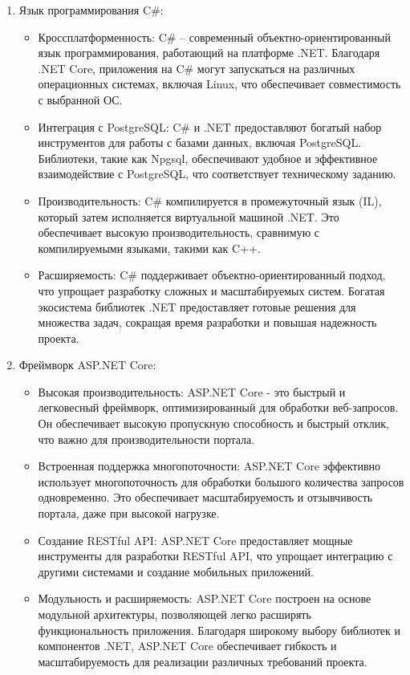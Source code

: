 \begin{enumerate}
	\item Язык программирования C\#:
	\begin{itemize}
		\item Кроссплатформенность: C\# -- современный объектно-ориентированный язык программирования, работающий на платформе .NET. Благодаря .NET Core, приложения на C\# могут запускаться на различных операционных системах, включая Linux, что обеспечивает совместимость с выбранной ОС.
		
		\item Интеграция с PostgreSQL: C\# и .NET предоставляют богатый набор инструментов для работы с базами данных, включая PostgreSQL. Библиотеки, такие как Npgsql, обеспечивают удобное и эффективное взаимодействие с PostgreSQL, что соответствует техническому заданию.
		
		\item Производительность: C\# компилируется в промежуточный язык (IL), который затем исполняется виртуальной машиной .NET. Это обеспечивает высокую производительность, сравнимую с компилируемыми языками, такими как C++.
		
		\item Расширяемость: C\# поддерживает объектно-ориентированный подход, что упрощает разработку сложных и масштабируемых систем. Богатая экосистема библиотек .NET предоставляет готовые решения для множества задач, сокращая время разработки и повышая надежность проекта.
	\end{itemize}
	\item Фреймворк ASP.NET Core:
	\begin{itemize}
		\item Высокая производительность: ASP.NET Core - это быстрый и легковесный фреймворк, оптимизированный для обработки веб-запросов. Он обеспечивает высокую пропускную способность и быстрый отклик, что важно для производительности портала.
		
		\item Встроенная поддержка многопоточности: ASP.NET Core эффективно использует многопоточность для обработки большого количества запросов одновременно. Это обеспечивает масштабируемость и отзывчивость портала, даже при высокой нагрузке.
		
		\item Создание RESTful API: ASP.NET Core предоставляет мощные инструменты для разработки RESTful API, что упрощает интеграцию с другими системами и создание мобильных приложений.
		
		\item Модульность и расширяемость: ASP.NET Core построен на основе модульной архитектуры, позволяющей легко расширять функциональность приложения. Благодаря широкому выбору библиотек и компонентов .NET, ASP.NET Core обеспечивает гибкость и масштабируемость для реализации различных требований проекта.
	\end{itemize}
\end{enumerate}


